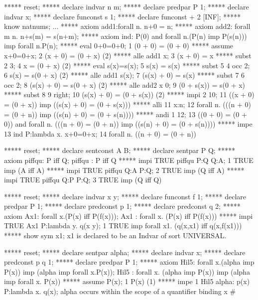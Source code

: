    ***** reset;
   ***** declare indvar n m;
   ***** declare predpar P 1;
   ***** declare indvar x;
   ***** declare funconst s 1;
   ***** declare funconst + 2 [INF];
   ***** know natnums;
   ...
   ***** axiom add1:forall n. n+0 = n;
   ***** axiom add2: forall m n. n+s(m) = s(n+m);
   ***** axiom ind:  P(0) and forall n.(P(n) imp P(s(n))) imp forall n.P(n);
   ***** eval 0+0=0+0;
   1   (0 + 0) = (0 + 0)     
   ***** assume x+0=0+x;
   2   (x + 0) = (0 + x)     (2)
   ***** alle add1 x;
   3   (x + 0) = x     
   ***** subst 2 3;
   4   x = (0 + x)     (2)
   ***** eval s(x)=s(x);
   5   s(x) = s(x)     
   ***** subst 5 4 occ 2;
   6   s(x) = s(0 + x)     (2)
   ***** alle add1 s(x);
   7   (s(x) + 0) = s(x)     
   ***** subst 7 6 occ 2;
   8   (s(x) + 0) = s(0 + x)     (2)
   ***** alle add2 x 0;
   9   (0 + s(x)) = s(0 + x)     
   ***** subst 8 9 right;
   10   (s(x) + 0) = (0 + s(x))     (2)
   ***** impi 2 10;
   11   ((x + 0) = (0 + x)) imp ((s(x) + 0) = (0 + s(x)))     
   ***** alli 11 x:n;
   12   forall n. (((n + 0) = (0 + n)) imp ((s(n) + 0) = (0 + s(n))))
   ***** andi 1 12;
   13   ((0 + 0) = (0 + 0)) and forall n. (((n + 0) = (0 + n)) imp 
        ((s(n) + 0) = (0 + s(n))))     
   ***** impe 13 ind P:lambda x. x+0=0+x;
   14   forall n. ((n + 0) = (0 + n))     
   
   ***** reset;
   ***** declare sentconst A B;
   ***** declare sentpar P Q;
   ***** axiom piffqu: P iff Q;
   piffqu : P iff Q
   ***** impi TRUE piffqu P:Q Q:A;
   1   TRUE imp (A iff A)     
   ***** impi TRUE piffqu Q:A P:Q;
   2   TRUE imp (Q iff A)     
   ***** impi TRUE piffqu Q:P P:Q;   
   3   TRUE imp (Q iff Q)     
   
   ***** reset;   
   ***** declare indvar x y;
   ***** declare funconst f 1;
   ***** declare predpar P 1;
   ***** declare predconst p 1;
   ***** declare predconst q 2;
   ***** axiom Ax1: forall x.(P(x) iff P(f(x)));
   Ax1 : forall x. (P(x) iff P(f(x)))
   ***** impi TRUE Ax1 P:lambda y. q(x y);
   1   TRUE imp forall x1. (q(x,x1) iff q(x,f(x1)))     
   ***** show sym x1;
   x1 is declared to be an Indvar of sort UNIVERSAL.
   
   ***** reset;
   ***** declare sentpar alpha;
   ***** declare indvar x;
   ***** declare predconst p q 1;
   ***** declare predpar P 1;
   ***** axiom Hil5: forall x.(alpha imp P(x)) imp (alpha imp forall x.P(x));
   Hil5 : forall x. (alpha imp P(x)) imp (alpha imp forall x. P(x))
   ***** assume P(x);
   1  P(x)     (1)
   ***** impe 1 Hil5  alpha: p(x) P:lambda x. q(x);
   alpha occurs within the scope of a quantifier binding x
#
   
